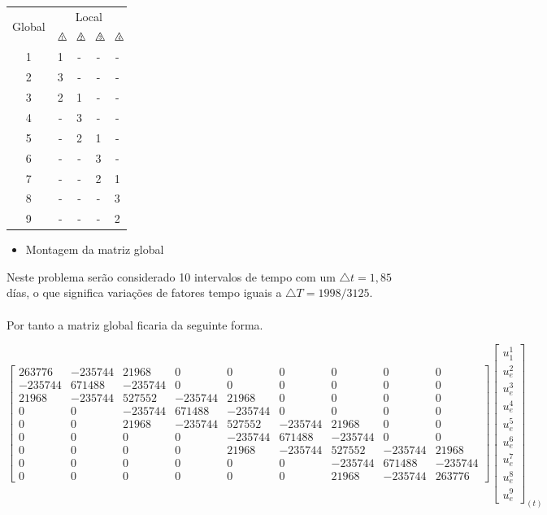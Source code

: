 \documentclass{article} %
\newcommand{\trinum}[1]{%
	\triangle\hspace{-.57em}\raisebox{0.1em}{\scalebox{.5}{#1}}
}
\begin{document}
\begin{table}[H]
	\centering
	\begin{tabular}{@{}ccccc@{}}
		\toprule
		\multirow{2}{*}{Global} & \multicolumn{4}{c}{Local} \\ \cmidrule(l){2-5} 
		& $\trinum{1}$& $\trinum{2}$ & $\trinum{3}$ & $\trinum{4}$ \\ \midrule
		1 & 1 & - & - & - \\
		2 & 3 & - & - & - \\
		3 & 2 & 1 & - & - \\
		4 & - & 3 & - & - \\
		5 & - & 2 & 1 & - \\
		6 & - & - & 3 & - \\
		7 & - & - & 2 & 1 \\
		8 & - & - & - & 3 \\
		9 & - & - & - & 2 \\ \bottomrule
	\end{tabular}
\end{table}



\begin{itemize}
	\item Montagem da matriz global
\end{itemize}

\indent Neste problema serão considerado 10 intervalos de tempo com um \(\triangle t=1,85\) días, o que significa variações de fatores tempo iguais a \(\triangle T=1998/3125\).\\
\\
\indent Por tanto a matriz global ficaria da seguinte forma.

\begin{equation*}
\begin{bmatrix}
263776&-235744&21968&0&0&0&0&0&0\\
-235744&671488& -235744& 0& 0& 0& 0& 0& 0\\
21968&-235744&527552&-235744&21968& 0& 0& 0& 0\\
0&0&-235744&671488&-235744& 0& 0& 0& 0\\
0&0&21968&-235744&527552&-235744&21968& 0& 0\\
0&0&0&0& -235744&671488&-235744& 0& 0\\
0&0&0&0&21968&-235744&527552&-235744&21968\\
0&0&0&0&0&0&-235744&671488&-235744\\
0&0&0&0&0&0&21968&-235744&263776
\end{bmatrix}\begin{bmatrix}
u_1^1\\
u_e^2\\
u_e^3\\
u_e^4\\
u_e^5\\
u_e^6\\
u_e^7\\
u_e^8\\
u_e^9
\end{bmatrix}_{(t)}
\end{equation*}
\end{document}
